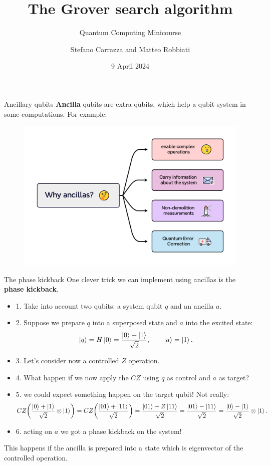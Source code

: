 \documentclass[aspectratio=169, 8pt, xcolor={svgnames}, hyperref={linkcolor=black}]{beamer}
\title{The Grover search algorithm}
\subtitle{Quantum Computing Minicourse}
\date{9 April 2024}
\author[Stefano Carrazza and Matteo Robbiati]{Stefano Carrazza and Matteo Robbiati}
\begin{document}
\maketitle

\begin{frame}{Ancillary qubits}
\textbf{Ancilla} qubits are extra qubits, which help a qubit system in some computations.   
For example:
   \begin{figure}
     \includegraphics[width=0.8\linewidth]{figures/ancillas.pdf}
   \end{figure}
\end{frame}

\begin{frame}{The phase kickback}
One clever trick we can implement using ancillas is the \textbf{phase kickback}.

\begin{itemize}[noitemsep]
\item{1.} Take into account two qubits: a system qubit $q$ and an ancilla $a$.  
\item{2.} Suppose we prepare $q$ into a superposed state and $a$ into the excited state:
$$ \ket{q}=H\ket{0} = \frac{\ket{0}+\ket{1}}{\sqrt{2}}, \qquad \ket{a}=\ket{1}. $$
\item{3.} Let's consider now a controlled $Z$ operation.
\item{4.} What happen if we now apply the $CZ$ using $q$ as control and $a$
as target?
\item{5.} we could expect something happen on the target qubit! Not really:
$$ CZ \biggl( \frac{\ket{0}+\ket{1}}{\sqrt{2}} \otimes \ket{1} \biggr)  = 
CZ \biggl( \frac{\ket{01}+\ket{11}}{\sqrt{2}} \biggr) = 
\frac{\ket{01}+Z\ket{11}}{\sqrt{2}} =
\frac{\ket{01}-\ket{11}}{\sqrt{2}} =
\frac{\ket{0}-\ket{1}}{\sqrt{2}} \otimes \ket{1}.
$$ 
\item{6.} acting on $a$ we got a phase kickback on the system!
\end{itemize}

\begin{tcolorbox}[colback=red!15, title=Important]
This happens if the ancilla is prepared into a state which is eigenvector of the 
controlled operation.
\end{tcolorbox}

\end{frame}
\end{document}
